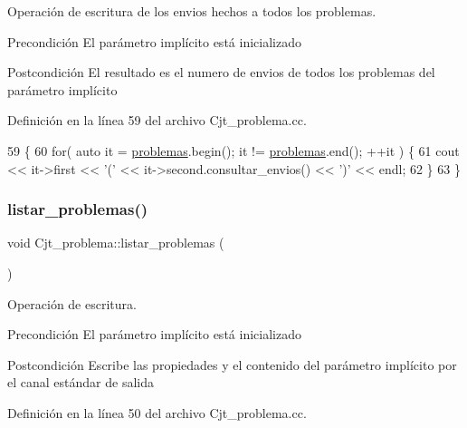 Operación de escritura de los envios hechos a todos los problemas. 

\begin{DoxyPrecond}{Precondición}
El parámetro implícito está inicializado 
\end{DoxyPrecond}
\begin{DoxyPostcond}{Postcondición}
El resultado es el numero de envios de todos los problemas del parámetro implícito 
\end{DoxyPostcond}


Definición en la línea 59 del archivo Cjt\+\_\+problema.\+cc.


\begin{DoxyCode}
59                                     \{
60   \textcolor{keywordflow}{for}( \textcolor{keyword}{auto} it = \mbox{\hyperlink{class_cjt__problema_a2d471986320805c5b27f8d14d486fca8}{problemas}}.begin(); it != \mbox{\hyperlink{class_cjt__problema_a2d471986320805c5b27f8d14d486fca8}{problemas}}.end(); ++it ) \{
61     cout << it->first << \textcolor{charliteral}{'('} << it->second.consultar\_envios() << \textcolor{charliteral}{')'} << endl;
62   \}
63 \}
\end{DoxyCode}
\mbox{\label{class_cjt__problema_a4966292b86b69ab0fef01154e79aeb54}} 
\subsubsection{\texorpdfstring{listar\+\_\+problemas()}{listar\_problemas()}}
{\footnotesize\ttfamily void Cjt\+\_\+problema\+::listar\+\_\+problemas (\begin{DoxyParamCaption}{ }\end{DoxyParamCaption})}



Operación de escritura. 

\begin{DoxyPrecond}{Precondición}
El parámetro implícito está inicializado 
\end{DoxyPrecond}
\begin{DoxyPostcond}{Postcondición}
Escribe las propiedades y el contenido del parámetro implícito por el canal estándar de salida 
\end{DoxyPostcond}


Definición en la línea 50 del archivo Cjt\+\_\+problema.\+cc.


